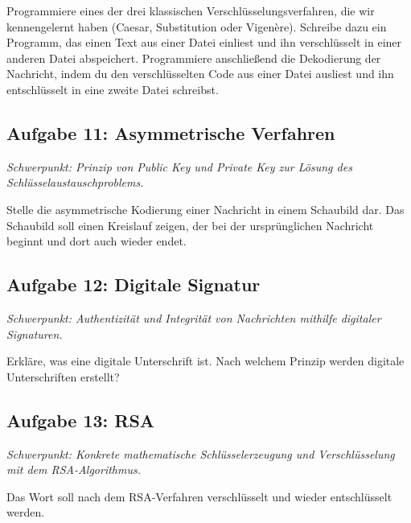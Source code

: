 Programmiere eines der drei klassischen Verschlüsselungsverfahren, die wir
kennengelernt haben (Caesar, Substitution oder Vigenère). Schreibe dazu ein
Programm, das einen Text aus einer Datei einliest und ihn verschlüsselt in
einer anderen Datei abspeichert. Programmiere anschließend die Dekodierung der
Nachricht, indem du den verschlüsselten Code aus einer Datei ausliest und ihn
entschlüsselt in eine zweite Datei schreibst.


\subsection{Aufgabe 11: Asymmetrische Verfahren \tagGKWahl}
\noindent \emph{Schwerpunkt: Prinzip von Public Key und Private Key zur Lösung des Schlüsselaustauschproblems.}

Stelle die asymmetrische Kodierung einer Nachricht in einem Schaubild dar. Das
Schaubild soll einen Kreislauf zeigen, der bei der ursprünglichen Nachricht
beginnt und dort auch wieder endet.


\subsection{Aufgabe 12: Digitale Signatur \tagGKWahl}
\noindent \emph{Schwerpunkt: Authentizität und Integrität von Nachrichten mithilfe digitaler Signaturen.}

Erkläre, was eine digitale Unterschrift ist. Nach welchem Prinzip werden
digitale Unterschriften erstellt?


\subsection{Aufgabe 13: RSA \tagZusatz \tagGKWahl}
\noindent \emph{Schwerpunkt: Konkrete mathematische Schlüsselerzeugung und Verschlüsselung mit dem RSA-Algorithmus.}

Das Wort  soll nach dem RSA-Verfahren verschlüsselt und
wieder entschlüsselt werden.

